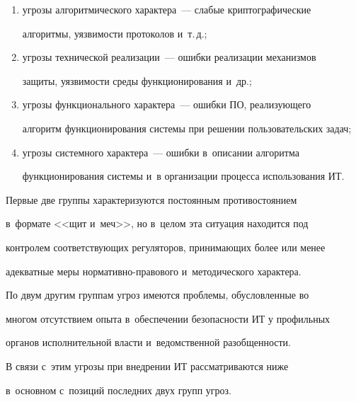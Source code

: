 \begin{enumerate}[(1)]


\item угрозы алгоритмического характера~--- слабые криптографические 


алгоритмы, уязвимости протоколов и~т.\,д.;


\item угрозы технической реализации~--- ошибки реализации механизмов 


защиты, уязвимости среды функционирования и~др.;


\item угрозы функционального характера~--- ошибки ПО, реализующего 


алгоритм функционирования системы при решении пользовательских задач;


\item угрозы системного характера~--- ошибки в~описании алгоритма 


функционирования системы и~в организации процесса использования ИТ.


\end{enumerate}





   Первые две группы характеризуются постоянным противостоянием 


в~формате <<щит и~меч>>, но в~целом эта ситуация находится под 


контролем соответствующих регуляторов, принимающих более или менее 


адекватные меры нор\-ма\-тив\-но-пра\-во\-во\-го и~методического характера. 


   


    По двум другим группам угроз имеются проблемы, обусловленные во 


многом отсутствием опыта в~обеспечении безопасности ИТ у профильных 


органов исполнительной власти и~ведомственной разобщенности. 




   В связи с~этим угрозы при внедрении ИТ рассматриваются ниже 


в~основном с~позиций последних двух групп угроз. 





\vspace*{-4pt}


